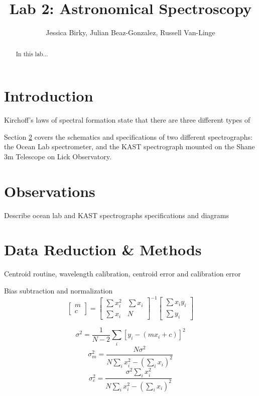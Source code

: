 \documentclass[preprint]{aastex62}
\begin{document}
\title{\sc Lab 2: Astronomical Spectroscopy}
\author{Jessica Birky, Julian Beaz-Gonzalez, Russell Van-Linge}


\begin{abstract}
In this lab... 

\end{abstract}
\bigskip

\section{Introduction} 
Kirchoff's laws of spectral formation state that there are three different types of 

Section \ref{sec:observations} covers the schematics and specifications of two different spectrographs: the Ocean Lab spectrometer, and the KAST spectrograph mounted on the Shane 3m Telescope on Lick Observatory.


\section{Observations} \label{sec:observations}
Describe ocean lab and KAST spectrographs specifications and diagrams

\section{Data Reduction \& Methods} \label{sec:methods}
Centroid routine, wavelength calibration, centroid error and calibration error

Bias subtraction and normalization
\begin{equation}
\begin{bmatrix}
    m \\ c
\end{bmatrix}
= 
\begin{bmatrix}
    \sum x_i^2 & \sum x_i \\
    \sum x_i & N
\end{bmatrix}^{-1}
\begin{bmatrix}
    \sum x_i y_i \\ \sum y_i
\end{bmatrix}
\end{equation}

\begin{equation}
    \sigma^2 = \frac{1}{N-2}\sum_i [y_i - (mx_i + c)]^2
\end{equation}
\begin{equation}
    \sigma_m^2 = \frac{N\sigma^2}{N\sum_i x_i^2 - \left(\sum_i x_i \right)^2}
\end{equation}
\begin{equation}
    \sigma_c^2 = \frac{\sigma^2 \sum_i x_i^2}{N\sum_i x_i^2 - \left(\sum_i x_i \right)^2}
\end{equation}
\end{document}
